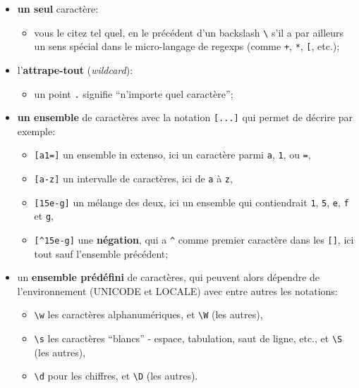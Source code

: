 \begin{itemize}
	\item 
    \textbf{un seul} caractère:
    \begin{itemize}
    	\item 
		vous le citez tel quel, en le précédent d'un backslash
		\texttt{\textbackslash{}} s'il a par ailleurs un sens spécial dans le
		micro-langage de regexps (comme \texttt{+}, \texttt{*}, \texttt{{[}},
		etc.);
	\end{itemize}
	\item	
	l'\textbf{attrape-tout} (\emph{wildcard}):
	\begin{itemize}
		\item 
		un point \texttt{.} signifie ``n'importe quel caractère'';
	\end{itemize}
	\item	
	\textbf{un ensemble}
	de caractères avec la notation \texttt{{[}...{]}} qui permet de décrire
	par exemple:
	\begin{itemize}
		\item 
		\texttt{{[}a1={]}} un ensemble in extenso, ici un
		caractère parmi \texttt{a}, \texttt{1}, ou \texttt{=},
		\item
		\texttt{{[}a-z{]}} un intervalle de caractères, ici de \texttt{a} à
		\texttt{z},
		\item
		\texttt{{[}15e-g{]}} un mélange des deux, ici un ensemble
		qui contiendrait \texttt{1}, \texttt{5}, \texttt{e}, \texttt{f} et
		\texttt{g},
		\item 	
		\texttt{{[}\^{}15e-g{]}} une \textbf{négation}, qui a
		\texttt{\^{}} comme premier caractère dans les \texttt{{[}{]}}, ici tout
		sauf l'ensemble précédent;
	\end{itemize}	
	\item
	un \textbf{ensemble prédéfini} de
	caractères, qui peuvent alors dépendre de l'environnement (UNICODE et
	LOCALE) avec entre autres les notations:
	\begin{itemize}
		\item 
		\texttt{\textbackslash{}w}
		les caractères alphanumériques, et \texttt{\textbackslash{}W} (les
		autres),
		\item
		\texttt{\textbackslash{}s} les caractères ``blancs'' -
		espace, tabulation, saut de ligne, etc., et \texttt{\textbackslash{}S}
		(les autres),
		\item
		\texttt{\textbackslash{}d} pour les chiffres, et
		\texttt{\textbackslash{}D} (les autres).
	\end{itemize}		
\end{itemize}

